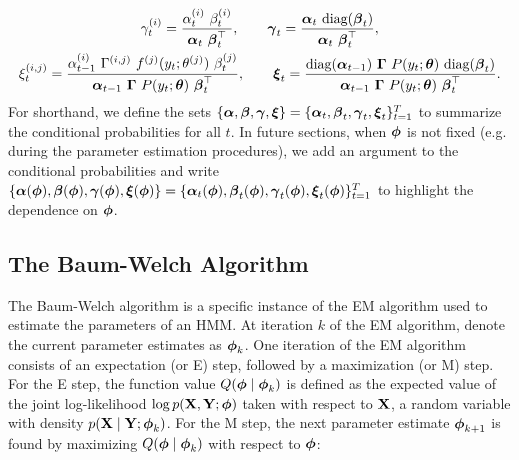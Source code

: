 \begin{gather}
    \gamma^{(i)}_t = \frac{\alpha^{(i)}_{t} ~ \beta^{(i)}_{t}}{\boldsymbol{\alpha}_{t} ~ \boldsymbol{\beta}_t^\top}, \qquad \boldsymbol{\gamma}_t = \frac{\boldsymbol{\alpha}_t ~ \text{diag}(\boldsymbol{\beta}_t)}{\boldsymbol{\alpha}_t ~ \boldsymbol{\beta}_t^\top} \label{eqn:gamma}, \\
    \xi_{t}^{(i,j)} = \frac{\alpha_{t-1}^{(i)} ~ \Gamma^{(i,j)} ~ f^{(j)}(y_{t};\theta^{(j)}) ~ \beta_{t}^{(j)}}{\boldsymbol{\alpha}_{t-1} ~ \boldsymbol{\Gamma} ~ P(y_{t};\boldsymbol{\theta}) ~ \boldsymbol{\beta}_{t}^\top}, \qquad \boldsymbol{\xi}_t = \frac{\text{diag}(\boldsymbol{\alpha}_{t-1}) ~ \boldsymbol{\Gamma} ~ P(y_t;\boldsymbol{\theta}) ~ \text{diag}(\boldsymbol{\beta}_t)}{\boldsymbol{\alpha}_{t-1} ~ \boldsymbol{\Gamma} ~ P(y_{t};\boldsymbol{\theta}) ~ \boldsymbol{\beta}_{t}^\top} \label{eqn:xi}.
\end{gather}
%
%
For shorthand, we define the sets $\{\boldsymbol{\alpha}, \boldsymbol{\beta}, \boldsymbol{\gamma}, \boldsymbol{\xi}\} = \{\boldsymbol{\alpha}_t, \boldsymbol{\beta}_t, \boldsymbol{\gamma}_t, \boldsymbol{\xi}_t\}_{t=1}^T$ to summarize the conditional probabilities for all $t$. In future sections, when $\boldsymbol{\phi}$ is not fixed (e.g. during the parameter estimation procedures), we add an argument to the conditional probabilities and write $\{\boldsymbol{\alpha}(\boldsymbol{\phi}), \boldsymbol{\beta}(\boldsymbol{\phi}), \boldsymbol{\gamma}(\boldsymbol{\phi}), \boldsymbol{\xi}(\boldsymbol{\phi})\} = \{\boldsymbol{\alpha}_t(\boldsymbol{\phi}), \boldsymbol{\beta}_t(\boldsymbol{\phi}), \boldsymbol{\gamma}_t(\boldsymbol{\phi}), \boldsymbol{\xi}_t(\boldsymbol{\phi})\}_{t=1}^T$ to highlight the dependence on $\boldsymbol{\phi}$. 

\subsection{The Baum-Welch Algorithm}

The Baum-Welch algorithm is a specific instance of the EM algorithm used to estimate the parameters of an HMM. %
At iteration $k$ of the EM algorithm, denote the current parameter estimates as $\boldsymbol{\phi}_{k}$. One iteration of the EM algorithm consists of an expectation (or E) step, followed by a maximization (or M) step. For the E step, the function value $Q(\boldsymbol{\phi} \mid \boldsymbol{\phi}_{k})$ is defined as the expected value of the joint log-likelihood $\log p(\mathbf{X},\mathbf{Y}; \boldsymbol{\phi})$ taken with respect to $\mathbf{X}$, a random variable with density $p(\mathbf{X} \mid \mathbf{Y} ; \boldsymbol{\phi}_{k})$. For the M step, the next parameter estimate $\boldsymbol{\phi}_{k+1}$ is found by maximizing $Q(\boldsymbol{\phi} \mid \boldsymbol{\phi}_{k})$ with respect to $\boldsymbol{\phi}$:

